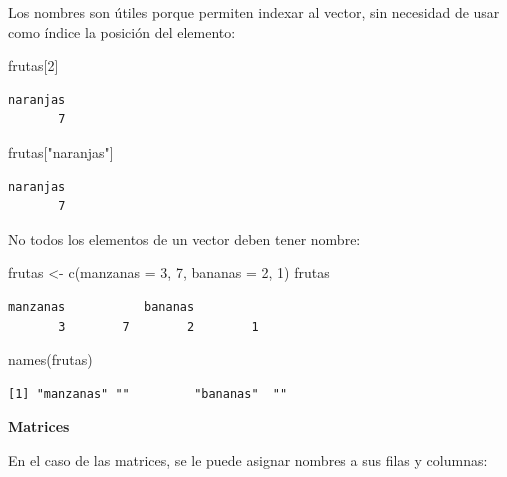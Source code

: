 \documentclass[
]{book}
\newenvironment{Shaded}{\begin{snugshade}}{\end{snugshade}}
\newcommand{\AttributeTok}[1]{\textcolor[rgb]{0.77,0.63,0.00}{#1}}
\newcommand{\DecValTok}[1]{\textcolor[rgb]{0.00,0.00,0.81}{#1}}
\newcommand{\FunctionTok}[1]{\textcolor[rgb]{0.00,0.00,0.00}{#1}}
\newcommand{\NormalTok}[1]{#1}
\newcommand{\OtherTok}[1]{\textcolor[rgb]{0.56,0.35,0.01}{#1}}
\newcommand{\StringTok}[1]{\textcolor[rgb]{0.31,0.60,0.02}{#1}}
\begin{document}
Los nombres son útiles porque permiten indexar al vector, sin necesidad de usar como índice la posición del elemento:

\begin{Shaded}
\begin{Highlighting}[]
\NormalTok{frutas[}\DecValTok{2}\NormalTok{]}
\end{Highlighting}
\end{Shaded}

\begin{verbatim}
naranjas 
       7 
\end{verbatim}

\begin{Shaded}
\begin{Highlighting}[]
\NormalTok{frutas[}\StringTok{"naranjas"}\NormalTok{]}
\end{Highlighting}
\end{Shaded}

\begin{verbatim}
naranjas 
       7 
\end{verbatim}

No todos los elementos de un vector deben tener nombre:

\begin{Shaded}
\begin{Highlighting}[]
\NormalTok{frutas }\OtherTok{\textless{}{-}} \FunctionTok{c}\NormalTok{(}\AttributeTok{manzanas =} \DecValTok{3}\NormalTok{, }\DecValTok{7}\NormalTok{, }\AttributeTok{bananas =} \DecValTok{2}\NormalTok{, }\DecValTok{1}\NormalTok{)}
\NormalTok{frutas}
\end{Highlighting}
\end{Shaded}

\begin{verbatim}
manzanas           bananas          
       3        7        2        1 
\end{verbatim}

\begin{Shaded}
\begin{Highlighting}[]
\FunctionTok{names}\NormalTok{(frutas)}
\end{Highlighting}
\end{Shaded}

\begin{verbatim}
[1] "manzanas" ""         "bananas"  ""        
\end{verbatim}

\textbf{Matrices}

En el caso de las matrices, se le puede asignar nombres a sus filas y columnas:
\end{document}
